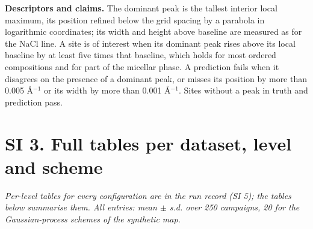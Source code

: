 \documentclass{iopjournal}
\begin{document}
\textbf{Descriptors and claims.} The dominant peak is the tallest interior local maximum, its position refined below the grid spacing by a parabola in logarithmic coordinates; its width and height above baseline are measured as for the NaCl line. A site is of interest when its dominant peak rises above its local baseline by at least five times that baseline, which holds for most ordered compositions and for part of the micellar phase. A prediction fails when it disagrees on the presence of a dominant peak, or misses its position by more than 0.005 \AA{}\ensuremath{^{-1}} or its width by more than 0.001 \AA{}\ensuremath{^{-1}}. Sites without a peak in truth and prediction pass.

\hypertarget{si-3.-full-tables-per-dataset-level-and-scheme}{%
\section*{SI 3. Full tables per dataset, level and scheme}\label{si-3.-full-tables-per-dataset-level-and-scheme}}

\emph{Per-level tables for every configuration are in the run record (SI 5); the tables below summarise them. All entries: mean \ensuremath{\pm} s.d. over 250 campaigns, 20 for the Gaussian-process schemes of the synthetic map.}
\end{document}
